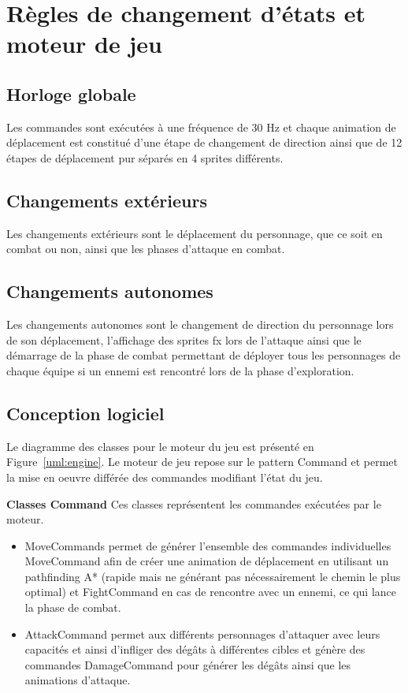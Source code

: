 \documentclass[a4paper,12pt]{article}
\begin{document}
\newpage
\begin{minipage}{\linewidth}

\end{minipage}

\newpage
\section{Règles de changement d'états et moteur de jeu}

\subsection{Horloge globale}
	Les commandes sont exécutées à une fréquence de 30 Hz et chaque animation de déplacement est constitué d'une étape de changement de direction ainsi que de 12 étapes de déplacement pur séparés en 4 sprites différents.


\subsection{Changements extérieurs}
	Les changements extérieurs sont le déplacement du personnage, que ce soit en combat ou non, ainsi que les phases d'attaque en combat.


\subsection{Changements autonomes}
	Les changements autonomes sont le changement de direction du personnage lors de son déplacement, l'affichage des sprites fx lors de l'attaque ainsi que le démarrage de la phase de combat permettant de déployer tous les personnages de chaque équipe si un ennemi est rencontré lors de la phase d'exploration.

\subsection{Conception logiciel}

Le diagramme des classes pour le moteur du jeu est présenté en Figure~\ref{uml:engine}. Le moteur de jeu repose sur le pattern Command et permet la mise en oeuvre différée des commandes modifiant l'état du jeu.

\textbf{Classes Command} Ces classes représentent les commandes exécutées par le moteur. 
\begin{itemize}
\item MoveCommands permet de générer l'ensemble des commandes individuelles MoveCommand afin de créer une animation de déplacement en utilisant un pathfinding A* (rapide mais ne générant pas nécessairement le chemin le plus optimal) et FightCommand en cas de rencontre avec un ennemi, ce qui lance la phase de combat.
\item AttackCommand permet aux différents personnages d'attaquer avec leurs capacités et ainsi d'infliger des dégâts à différentes cibles et génère des commandes DamageCommand pour générer les dégâts ainsi que les animations d'attaque.
\end{itemize}
\end{document}
